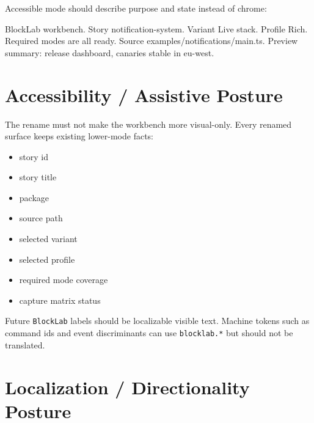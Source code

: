 Accessible mode should describe purpose and state instead of chrome:

\begin{CodeBlock}
BlockLab workbench. Story notification-system. Variant Live stack.
Profile Rich. Required modes are all ready. Source examples/notifications/main.ts.
Preview summary: release dashboard, canaries stable in eu-west.
\end{CodeBlock}

\section{Accessibility / Assistive Posture}\label{record-134-accessibility-assistive-posture}

The rename must not make the workbench more visual-only. Every renamed surface keeps existing lower-mode facts:

\begin{itemize}
\tightlist
\item
  story id
\item
  story title
\item
  package
\item
  source path
\item
  selected variant
\item
  selected profile
\item
  required mode coverage
\item
  capture matrix status
\end{itemize}

Future \texttt{B\allowbreak{}l\allowbreak{}o\allowbreak{}c\allowbreak{}k\allowbreak{}L\allowbreak{}a\allowbreak{}b} labels should be localizable visible text. Machine tokens such as command ids and event discriminants can use \texttt{b\allowbreak{}l\allowbreak{}o\allowbreak{}c\allowbreak{}k\allowbreak{}l\allowbreak{}a\allowbreak{}b\allowbreak{}.\allowbreak{}*} but should not be translated.

\section{Localization / Directionality Posture}\label{record-134-localization-directionality-posture}

